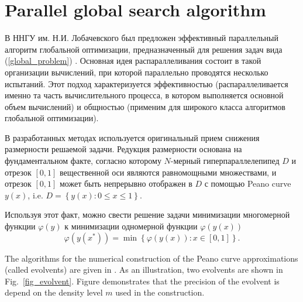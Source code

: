 \documentclass{svproc}
\begin{document}
\section{Parallel global search algorithm}

В ННГУ им. Н.И. Лобачевского был предложен \cite{Barkalov2018,Strongin2018,globalizerSystem} эффективный параллельный алгоритм глобальной оптимизации, предназначенный для решения задач вида (\ref{global_problem}) . 
Основная идея распараллеливания состоит в такой организации вычислений, при которой параллельно проводятся несколько испытаний. Этот подход характеризуется эффективностью (распараллеливается именно та часть вычислительного процесса, в котором выполняется основной объем вычислений) и общностью (применим для широкого класса алгоритмов глобальной оптимизации).

В разработанных методах используется оригинальный прием снижения размерности решаемой задачи. 
Редукция размерности основана на фундаментальном факте, согласно которому $N$-мерный гиперпараллелепипед $D$ и отрезок $[0,1]$ вещественной оси являются равномощными множествами, и отрезок $[0,1]$ может быть непрерывно отображен в $D$ с помощью Peano curve $y(x)$, i.e. $D = \left\{y(x):0\leq x\leq 1\right\}$.

Используя этот факт, можно свести решение задачи минимизации многомерной функции $\varphi(y)$ к минимизации одномерной функции $\varphi(y(x))$
\begin{equation}\label{1d_problem}
\varphi(y (x^*)) = \min \left\{ \varphi (y(x)) : x\in [0,1] \right\}.
\end{equation}

The algorithms for the numerical construction of the Peano curve approximations (called evolvents)
are given in \cite{Strongin2000,Sergeyev2013}. As an illustration, two evolvents are shown in Fig.~\ref{fig_evolvent}. Figure demonstrates that the precision of the evolvent is depend on the density level $m$ used in the construction.
\end{document}
